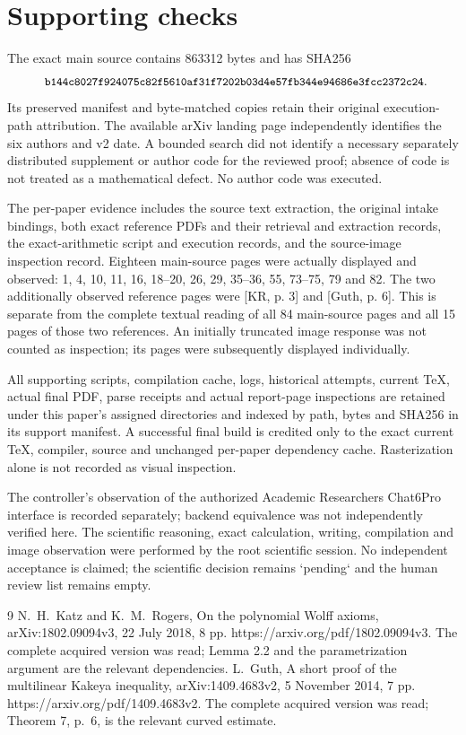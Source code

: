 \documentclass[10pt]{article}
\begin{document}
\section*{Supporting checks}
The exact main source contains 863312 bytes and has SHA256 \[\text{\small\texttt{ b144c8027f924075c82f5610af31f7202b03d4e57fb344e94686e3fcc2372c24}}.\] Its preserved manifest and byte-matched copies retain their original execution-path attribution. The available arXiv landing page independently identifies the six authors and v2 date. A bounded search did not identify a necessary separately distributed supplement or author code for the reviewed proof; absence of code is not treated as a mathematical defect. No author code was executed.\par
The per-paper evidence includes the source text extraction, the original intake bindings, both exact reference PDFs and their retrieval and extraction records, the exact-arithmetic script and execution records, and the source-image inspection record. Eighteen main-source pages were actually displayed and observed: 1, 4, 10, 11, 16, 18–20, 26, 29, 35–36, 55, 73–75, 79 and 82. The two additionally observed reference pages were [KR, p. 3] and [Guth, p. 6]. This is separate from the complete textual reading of all 84 main-source pages and all 15 pages of those two references. An initially truncated image response was not counted as inspection; its pages were subsequently displayed individually.\par
All supporting scripts, compilation cache, logs, historical attempts, current TeX, actual final PDF, parse receipts and actual report-page inspections are retained under this paper’s assigned directories and indexed by path, bytes and SHA256 in its support manifest. A successful final build is credited only to the exact current TeX, compiler, source and unchanged per-paper dependency cache. Rasterization alone is not recorded as visual inspection.\par
The controller’s observation of the authorized Academic Researchers Chat6Pro interface is recorded separately; backend equivalence was not independently verified here. The scientific reasoning, exact calculation, writing, compilation and image observation were performed by the root scientific session. No independent acceptance is claimed; the scientific decision remains `pending` and the human review list remains empty.\par
9 N. H. Katz and K. M. Rogers, On the polynomial Wolff axioms, arXiv:1802.09094v3, 22 July 2018, 8 pp. https://arxiv.org/pdf/1802.09094v3. The complete acquired version was read; Lemma 2.2 and the parametrization argument are the relevant dependencies. L. Guth, A short proof of the multilinear Kakeya inequality, arXiv:1409.4683v2, 5 November 2014, 7 pp. https://arxiv.org/pdf/1409.4683v2. The complete acquired version was read; Theorem 7, p. 6, is the relevant curved estimate.\par
\end{document}
